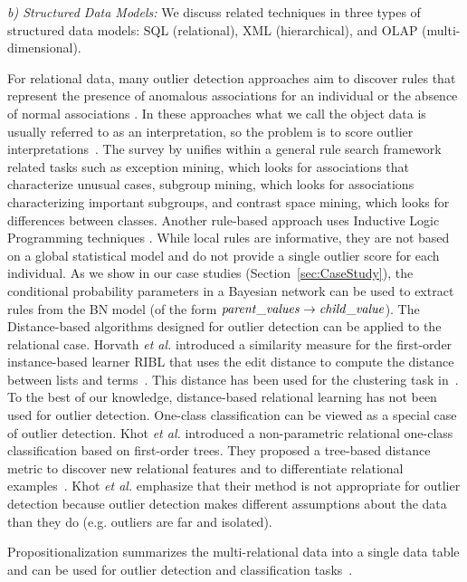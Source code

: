 {				\textit{b) Structured Data Models:} We discuss related techniques in three types of structured data models: SQL (relational), XML (hierarchical), and OLAP (multi-dimensional). 
				
				For relational data, many outlier detection approaches aim to discover rules that represent the presence of anomalous associations for an individual or the absence of normal associations \cite{Maervoet2012,Gao2010}.    In these approaches what we call the object data is usually referred to as an interpretation, so the problem is to score outlier interpretations~\cite{Maervoet2012}. The survey by \cite{Novak2009} unifies within a general rule search framework related tasks such as exception mining, which looks for associations that characterize unusual cases, subgroup mining, which looks for associations  characterizing important subgroups, and contrast space mining, which looks for differences between classes. Another rule-based approach uses Inductive Logic Programming techniques \cite{Angiulli2007}.
				While local rules are informative, they are not based on a global statistical model and do not provide a single outlier score for each individual. As we show in our case studies (Section~\ref{sec:CaseStudy}), the conditional probability parameters in a Bayesian network can be used to extract rules  from the BN model (of the form $\it{parent\_values} \rightarrow \it{child\_value}$).
				The Distance-based algorithms designed for outlier detection can be applied to the relational case.  Horvath {\em et al.} introduced a similarity measure for the first-order instance-based learner RIBL that uses the edit distance to compute the distance between lists and terms~\cite{Horvath2001}. This distance has been used for the clustering task in~\cite{Kirsten2001}. To the best of our knowledge, distance-based relational learning has not been used for outlier detection. One-class classification can be viewed as a special case of outlier detection.  Khot {\em et al.} introduced a non-parametric relational one-class classification based on first-order trees. They proposed a tree-based distance metric to discover new relational features and to differentiate relational examples~\cite{Khot2014}. Khot {\em et al.} emphasize that their method is not appropriate for outlier detection because outlier detection makes different assumptions about the data than they do (e.g. outliers are far and isolated).  
				
				 Propositionalization summarizes the multi-relational data into a single data table and can be used for outlier detection and classification tasks~\cite{Kramer2000,Lavrac13,kuzelka2008,Riahi2016,AndersonP08}. 
				
}
